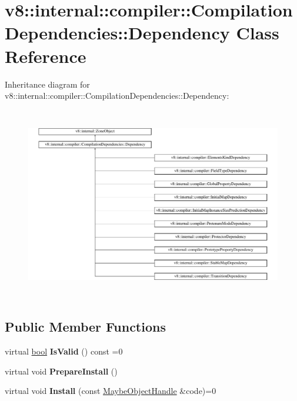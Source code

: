 \hypertarget{classv8_1_1internal_1_1compiler_1_1CompilationDependencies_1_1Dependency}{}\section{v8\+:\+:internal\+:\+:compiler\+:\+:Compilation\+Dependencies\+:\+:Dependency Class Reference}
\label{classv8_1_1internal_1_1compiler_1_1CompilationDependencies_1_1Dependency}
Inheritance diagram for v8\+:\+:internal\+:\+:compiler\+:\+:Compilation\+Dependencies\+:\+:Dependency\+:\begin{figure}[H]
\begin{center}
\leavevmode
\includegraphics[height=8.484848cm]{classv8_1_1internal_1_1compiler_1_1CompilationDependencies_1_1Dependency}
\end{center}
\end{figure}
\subsection*{Public Member Functions}
\begin{DoxyCompactItemize}
\item 
\mbox{\label{classv8_1_1internal_1_1compiler_1_1CompilationDependencies_1_1Dependency_a959c14057a52c25a5c030c8c66a95338}} 
virtual \mbox{\hyperlink{classbool}{bool}} {\bfseries Is\+Valid} () const =0
\item 
\mbox{\label{classv8_1_1internal_1_1compiler_1_1CompilationDependencies_1_1Dependency_af062306a32e64d51c566328fcb94c584}} 
virtual void {\bfseries Prepare\+Install} ()
\item 
\mbox{\label{classv8_1_1internal_1_1compiler_1_1CompilationDependencies_1_1Dependency_aaa915610394bcc8c0417e469aa8611fa}} 
virtual void {\bfseries Install} (const \mbox{\hyperlink{classv8_1_1internal_1_1MaybeObjectHandle}{Maybe\+Object\+Handle}} \&code)=0
\end{DoxyCompactItemize}


